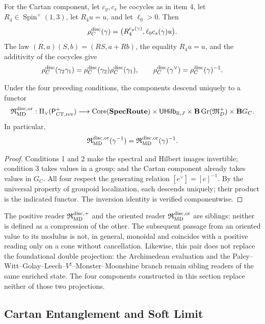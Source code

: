 For the Cartan component, let \(c_g,c_s\) be cocycles as in item 4,
let \(R_4\in\operatorname{Spin}^{+}(1,3)\), let \(R_4u=u\), and let
\(\ell_0>0\). Then
\[
 \rho_C^{\rm disc}(\gamma)
 =\bigl(R_4^{c_g(\gamma)},\ell_0c_s(\gamma)u\bigr).
\]
The law
\((R,a)(S,b)=(RS,a+Rb)\), the equality \(R_4u=u\), and the additivity of the
cocycles give
\[
 \rho_C^{\rm disc}(\gamma_2\gamma_1)
 =\rho_C^{\rm disc}(\gamma_2)\rho_C^{\rm disc}(\gamma_1),
 \qquad
 \rho_C^{\rm disc}(\gamma^\vee)
 =\rho_C^{\rm disc}(\gamma)^{-1}.
\]

\begin{theorem}
\label{thm:int68-realizacion-orientada}
Under the four preceding conditions, the components descend uniquely
to a functor
\[
 \mathfrak R_{\rm MD}^{\rm disc,or}:
 \Pi_\vee(\mathsf P_{{\rm CT},{\rm rev}}^+)
 \longrightarrow
 \operatorname{Core}(\mathbf{SpecRoute})
 \times\mathsf{UHilb}_{\mathbb R,J}
 \times\mathbf B\operatorname{Gr}(\mathfrak M_D^+)
 \times\mathbf BG_C.
\]
In particular,
\[
 \mathfrak R_{\rm MD}^{\rm disc,or}(\gamma^{-1})
 =\mathfrak R_{\rm MD}^{\rm disc,or}(\gamma)^{-1}.
\]
\end{theorem}

\begin{proof}
Conditions 1 and 2 make the spectral and
Hilbert images invertible; condition 3 takes values in a group; and the Cartan
component already takes values in \(G_C\). All four respect the generating relation
\([e^\vee]=[e]^{-1}\). By the universal property of groupoid
localization, each descends uniquely; their product is the indicated
functor. The inversion identity is verified componentwise.
\end{proof}

The positive reader \(\mathfrak R_{\rm MD}^{\rm disc,+}\) and the oriented reader
\(\mathfrak R_{\rm MD}^{\rm disc,or}\) are siblings: neither is defined as a
compression of the other. The subsequent passage from an oriented value to its modulus is
not, in general, monoidal and coincides with a positive reading only on a cone
without cancellation. Likewise, this pair does not replace the foundational double projection:
the Archimedean evaluation and the
Paley--Witt--Golay--Leech--\(V^\natural\)--Monster--Moonshine branch remain
sibling readers of the same enriched state. The four components
constructed in this section replace neither of those two projections.

\subsection{Cartan Entanglement and Soft Limit}


